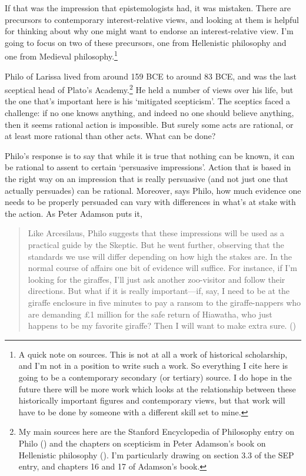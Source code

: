 \documentclass[
  10pt,
  letterpaper,
  twoside]{scrbook}
\begin{document}
If that was the impression that epistemologists had, it was mistaken.
There are precursors to contemporary interest-relative views, and
looking at them is helpful for thinking about why one might want to
endorse an interest-relative view. I'm going to focus on two of these
precursors, one from Hellenistic philosophy and one from Medieval
philosophy.\footnote{A quick note on sources. This is not at all a work
  of historical scholarship, and I'm not in a position to write such a
  work. So everything I cite here is going to be a contemporary
  secondary (or tertiary) source. I do hope in the future there will be
  more work which looks at the relationship between these historically
  important figures and contemporary views, but that work will have to
  be done by someone with a different skill set to mine.}

Philo of Larissa lived from around 159 BCE to around 83 BCE, and was the
last sceptical head of Plato's Academy.\footnote{My main sources here
  are the Stanford Encyclopedia of Philosophy entry on Philo
  () and the
  chapters on scepticism in Peter Adamson's book on Hellenistic
  philosophy (). I'm
  particularly drawing on section 3.3 of the SEP entry, and chapters 16
  and 17 of Adamson's book.} He held a number of views over his life,
but the one that's important here is his `mitigated scepticism'. The
sceptics faced a challenge: if no one knows anything, and indeed no one
should believe anything, then it seems rational action is impossible.
But surely some acts are rational, or at least more rational than other
acts. What can be done?

Philo's response is to say that while it is true that nothing can be
known, it can be rational to assent to certain `persuasive impressions'.
Action that is based in the right way on an impression that is really
persuasive (and not just one that actually persuades) can be rational.
Moreover, says Philo, how much evidence one needs to be properly
persuaded can vary with differences in what's at stake with the action.
As Peter Adamson puts it,

\begin{quote}
Like Arcesilaus, Philo suggests that these impressions will be used as a
practical guide by the Skeptic. But he went further, observing that the
standards we use will differ depending on how high the stakes are. In
the normal course of affairs one bit of evidence will suffice. For
instance, if I'm looking for the giraffes, I'll just ask another
zoo-visitor and follow their directions. But what if it is really
important---if, say, I need to be at the giraffe enclosure in five
minutes to pay a ransom to the giraffe-nappers who are demanding £1
million for the safe return of Hiawatha, who just happens to be my
favorite giraffe? Then I will want to make extra sure.
()
\end{quote}
\end{document}
